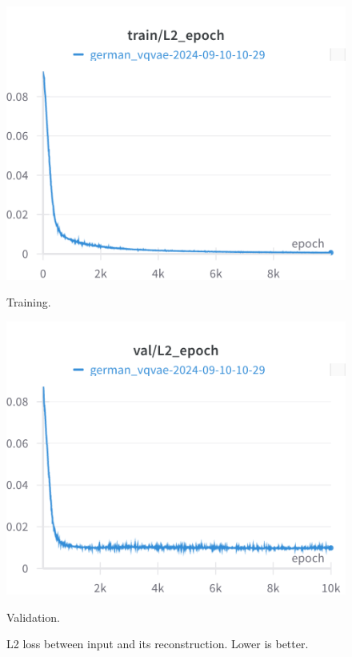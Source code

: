 \begin{figure}[H]
\includegraphics[width=\linewidth]{detailed_engineering/German VQVAE/charts/train_l2.png}
\caption{Training.}
\endminipage\hfill
{}
\includegraphics[width=\linewidth]{detailed_engineering/German VQVAE/charts/val_l2.png}
\caption{Validation.}
\endminipage
\caption{L2 loss between input and its reconstruction. Lower is better.}
\end{figure}

